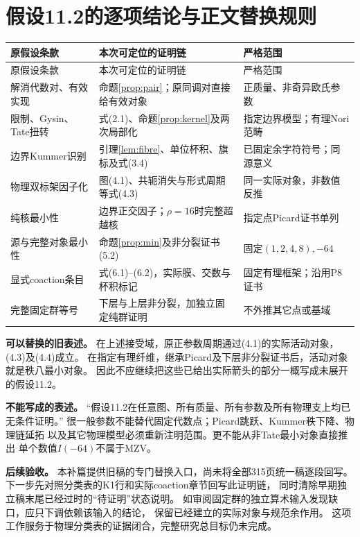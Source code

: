 \documentclass[11pt,a4paper]{ctexart}
\theoremstyle{cnplain}\newtheorem{theorem}{定理}[section]
\theoremstyle{remark}\newtheorem{remark}[theorem]{注}
\begin{document}
\section{假设11.2的逐项结论与正文替换规则}
\small
\begin{longtable}{>{\raggedright\arraybackslash}p{}
>{\raggedright\arraybackslash}p{}
>{\raggedright\arraybackslash}p{}}
\toprule 原假设条款&本次可定位的证明链&严格范围\\\midrule
\endfirsthead
\toprule 原假设条款&本次可定位的证明链&严格范围\\\midrule
\endhead
解消代数对、有效实现&命题\ref{prop:pair}；原同调对直接给有效对象&正质量、非奇异欧氏参数\\
限制、Gysin、Tate扭转&式(2.1)、命题\ref{prop:kernel}及两次局部化&指定边界模型；有理Nori范畴\\
边界Kummer识别&引理\ref{lem:fibre}、单位杯积、旗标及式(3.4)&已固定余字符符号；同源意义\\
物理双标架因子化&图(4.1)、共轭消失与形式周期等式(4.3)&同一实际对象，非数值反推\\
纯核最小性&边界正交因子；$\rho=16$时完整超越核&指定点Picard证书单列\\
源与完整对象最小性&命题\ref{prop:min}及非分裂证书(5.2)&固定$(1,2,4,8),-64$\\
显式coaction条目&式(6.1)--(6.2)，实际膜、交数与杯积标记&固定有理框架；沿用P8证书\\
完整固定群等号&下层与上层非分裂，加独立固定纯群证明&不外推其它点或基域\\
\bottomrule
\end{longtable}
\normalsize

\textbf{可以替换的旧表述。}
在上述接受域，原正参数周期通过(4.1)的实际活动对象，(4.3)及(4.4)成立。
在指定有理纤维，继承Picard及下层非分裂证书后，活动对象就是秩八最小对象。
因此不应继续把这些已给出实际箭头的部分一概写成未展开的假设11.2。

\textbf{不能写成的表述。}
“假设11.2在任意图、所有质量、所有参数及所有物理支上均已无条件证明。”
很一般参数不能替代固定代数点；Picard跳跃、Kummer秩下降、物理链延拓
以及其它物理模型必须重新注明范围。更不能从非Tate最小对象直接推出
单个数值$I(-64)$不属于MZV。

\textbf{后续验收。}
本补篇提供旧稿的专门替换入口，尚未将全部315页统一稿逐段回写。
下一步先对照分类表的K1行和实际coaction章节回写此证明链，
同时清除早期独立稿末尾已经过时的“待证明”状态说明。
如审阅固定群的独立算术输入发现缺口，应只下调依赖该输入的结论，
保留已经建立的实际对象与规范余作用。
这项工作服务于物理分类表的证据闭合，完整研究总目标仍未完成。
\end{document}
